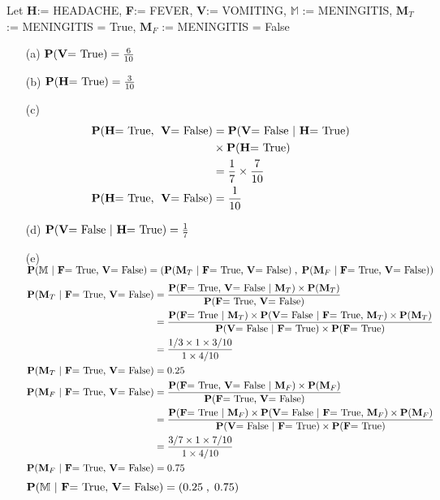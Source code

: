 \documentclass[10pt,a4paper]{article}
\newcommand{\m}{\mathbb{M}}
\newcommand{\mm}{\textbf{M}}
\newcommand{\h}{\textbf{H}}
\newcommand{\f}{\textbf{F}}
\newcommand{\vv}{\textbf{V}}
\newcommand{\p}{\textbf{P}}
\begin{document}
		Let \h := HEADACHE, \f := FEVER, \vv := VOMITING, \newline $\m$ := MENINGITIS, $\mm_{T}$ := MENINGITIS = True, $\mm_{F}$ := MENINGITIS = False
	
		\begin{enumerate}
			\item[(a)] $\p(\text{\vv = True}) = \frac{6}{10}$
			
			\item[(b)] $\p(\text{\h = True}) = \frac{3}{10}$
			
			\item[(c)] \begin{equation*}
				\begin{split}
					\p(\text{\h = True,\; \vv = False}) & = \p(\text{\vv = False | \h = True}) \\
					& \times \p(\text{\h = True}) \\
					& = \frac{1}{7} \times \frac{7}{10} \\
					\p(\text{\h = True,\; \vv = False}) & = \frac{1}{10}
				\end{split}
			\end{equation*}
			
			\item[(d)] $\p(\text{\vv = False | \h = True}) = \frac{1}{7}$
			
			\item[(e)] $\p(\m\text{ | \f = True, \vv = False}) = (\p(\text{$\mm_{T}$ | \f = True, \vv = False}) \;,\; \p(\text{$\mm_{F}$ | \f = True, \vv = False}))$ %
				\begin{equation*}
					\begin{split}
						\p(\text{$\mm_{T}$ | \f = True, \vv = False}) & = \frac{ \p(\text{\f = True, \vv = False | $\mm_{T}$}) \times \p(\mm_{T}) }{\p(\text{\f = True, \vv = False})} \\
						& = \frac{ \p(\text{\f = True | $\mm_{T}$}) \times \p(\text{\vv = False | \f = True, $\mm_{T}$}) \times \p(\mm_{T}) }{\p(\text{\vv = False | \f = True}) \times \p(\text{\f = True})} \\
						& = \frac{1/3 \times 1 \times 3/10}{1 \times 4/10} \\
						\p(\text{$\mm_{T}$ | \f = True, \vv = False}) & = 0.25 \\
						\p(\text{$\mm_{F}$ | \f = True, \vv = False}) & = \frac{ \p(\text{\f = True, \vv = False | $\mm_{F}$}) \times \p(\mm_{F}) }{\p(\text{\f = True, \vv = False})} \\
						& = \frac{ \p(\text{\f = True | $\mm_{F}$}) \times \p(\text{\vv = False | \f = True, $\mm_{F}$}) \times \p(\mm_{F}) }{\p(\text{\vv = False | \f = True}) \times \p(\text{\f = True})} \\
						& = \frac{3/7 \times 1 \times 7/10}{1 \times 4/10} \\
						\p(\text{$\mm_{F}$ | \f = True, \vv = False}) & = 0.75
					\end{split}
				\end{equation*}
				$\p(\m\text{ | \f = True, \vv = False}) = (0.25 \;,\; 0.75)$
				
		\end{enumerate}
	
\end{document}
